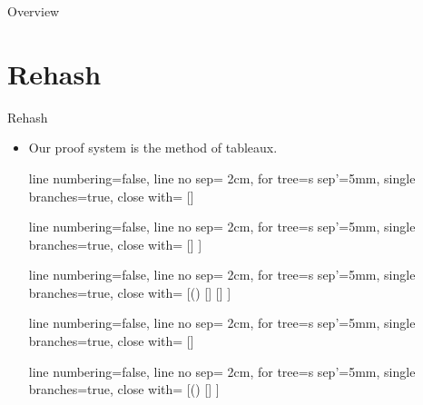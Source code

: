 \setcounter{framenumber}{200}
\begin{frame}
  \maketitle
\end{frame}

\begin{frame}{Overview}
\tableofcontents
\end{frame}

\section{Rehash}
\begin{frame}{Rehash}
	
\begin{itemize}

	\item Our proof system is the method of tableaux.

	
	{\tiny\begin{center}
					
					\begin{prooftree}
					{
					line numbering=false,
					line no sep= 2cm,
					for tree={s sep'=5mm},
					single branches=true,
					close with=\xmark
					}
					[\neg\neg \phi [\phi ] ]
					\end{prooftree}
					\begin{prooftree}
					{
					line numbering=false,
					line no sep= 2cm,
					for tree={s sep'=5mm},
					single branches=true,
					close with=\xmark
					}
					[\phi\land\psi [\phi [\psi ] ] ]
					\end{prooftree}
					\begin{prooftree}
					{
					line numbering=false,
					line no sep= 2cm,
					for tree={s sep'=5mm},
					single branches=true,
					close with=\xmark
					}
					[\neg (\phi\land\psi) [\neg \phi ] [\neg \psi ] ]
					\end{prooftree}
					\begin{prooftree}
					{
					line numbering=false,
					line no sep= 2cm,
					for tree={s sep'=5mm},
					single branches=true,
					close with=\xmark
					}
					[\phi\lor\psi [\phi ] [\psi ] ]
					\end{prooftree}
					\begin{prooftree}
					{
					line numbering=false,
					line no sep= 2cm,
					for tree={s sep'=5mm},
					single branches=true,
					close with=\xmark
					}
					[\neg(\phi\lor\psi) [\neg\phi [\neg\psi ] ] ]
					\end{prooftree}


\end{center}}
\end{itemize}
\end{frame}

